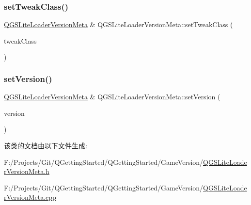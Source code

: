 \mbox{\label{class_q_g_s_lite_loader_version_meta_a370f0bb604d3a0124728bd704c7f14de}} 
\subsubsection{\texorpdfstring{set\+Tweak\+Class()}{setTweakClass()}}
{\footnotesize\ttfamily \mbox{\hyperlink{class_q_g_s_lite_loader_version_meta}{Q\+G\+S\+Lite\+Loader\+Version\+Meta}} \& Q\+G\+S\+Lite\+Loader\+Version\+Meta\+::set\+Tweak\+Class (\begin{DoxyParamCaption}\item[{const Q\+String \&}]{tweak\+Class }\end{DoxyParamCaption})}

\mbox{\label{class_q_g_s_lite_loader_version_meta_a4938e169e2e45c356ac2bb4b68239841}} 
\subsubsection{\texorpdfstring{set\+Version()}{setVersion()}}
{\footnotesize\ttfamily \mbox{\hyperlink{class_q_g_s_lite_loader_version_meta}{Q\+G\+S\+Lite\+Loader\+Version\+Meta}} \& Q\+G\+S\+Lite\+Loader\+Version\+Meta\+::set\+Version (\begin{DoxyParamCaption}\item[{const Q\+String \&}]{version }\end{DoxyParamCaption})}



该类的文档由以下文件生成\+:\begin{DoxyCompactItemize}
\item 
F\+:/\+Projects/\+Git/\+Q\+Getting\+Started/\+Q\+Getting\+Started/\+Game\+Version/\mbox{\hyperlink{_q_g_s_lite_loader_version_meta_8h}{Q\+G\+S\+Lite\+Loader\+Version\+Meta.\+h}}\item 
F\+:/\+Projects/\+Git/\+Q\+Getting\+Started/\+Q\+Getting\+Started/\+Game\+Version/\mbox{\hyperlink{_q_g_s_lite_loader_version_meta_8cpp}{Q\+G\+S\+Lite\+Loader\+Version\+Meta.\+cpp}}\end{DoxyCompactItemize}
